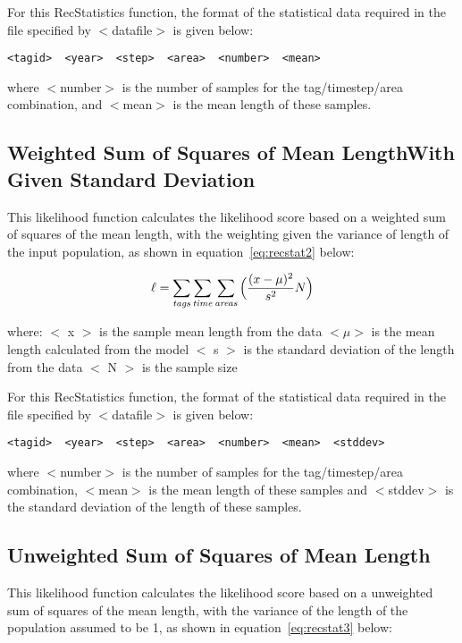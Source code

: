 \documentclass [a4paper, 10pt]{book}
\begin{document}
\bigskip
For this RecStatistics function, the format of the statistical data required in the file specified by $<$datafile$>$ is given below:

{\small\begin{verbatim}
<tagid>  <year>  <step>  <area>  <number>  <mean>
\end{verbatim}}

where $<$number$>$ is the number of samples for the tag/timestep/area combination, and $<$mean$>$ is the mean length of these samples.

\subsection{Weighted Sum of Squares of Mean Length\newline With Given Standard Deviation}
This likelihood function calculates the likelihood score based on a weighted sum of squares of the mean length, with the weighting given the variance of length of the input population, as shown in  equation~\ref{eq:recstat2} below:

\begin{equation}\label{eq:recstat2}
\ell = \sum_{\it tags}\sum_{\it time}\sum_{\it areas} \Big(\frac{(x-\mu)^2} {s^2} N\Big)
\end{equation}

where:\newline
$<$ x $>$ is the sample mean length from the data\newline
$<\mu>$ is the mean length calculated from the model\newline
$<$ s $>$ is the standard deviation of the length from the data\newline
$<$ N $>$ is the sample size

\bigskip
For this RecStatistics function, the format of the statistical data required in the file specified by $<$datafile$>$ is given below:

{\small\begin{verbatim}
<tagid>  <year>  <step>  <area>  <number>  <mean>  <stddev>
\end{verbatim}}

where $<$number$>$ is the number of samples for the tag/timestep/area combination, $<$mean$>$ is the mean length of these samples and $<$stddev$>$ is the standard deviation of the length of these samples.

\subsection{Unweighted Sum of Squares of Mean Length}
This likelihood function calculates the likelihood score based on a unweighted sum of squares of the mean length, with the variance of the length of the population assumed to be 1, as shown in equation~\ref{eq:recstat3} below:
\end{document}
